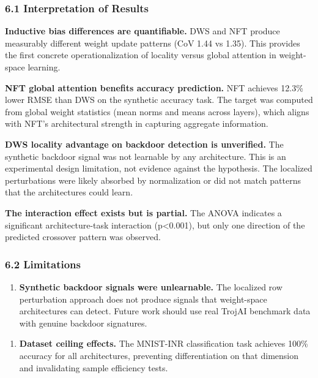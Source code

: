 
\subsubsection{6.1 Interpretation of Results}

\textbf{Inductive bias differences are quantifiable.} DWS and NFT produce measurably different weight update patterns (CoV 1.44 vs 1.35). This provides the first concrete operationalization of locality versus global attention in weight-space learning.

\textbf{NFT global attention benefits accuracy prediction.} NFT achieves 12.3\% lower RMSE than DWS on the synthetic accuracy task. The target was computed from global weight statistics (mean norms and means across layers), which aligns with NFT's architectural strength in capturing aggregate information.

\textbf{DWS locality advantage on backdoor detection is unverified.} The synthetic backdoor signal was not learnable by any architecture. This is an experimental design limitation, not evidence against the hypothesis. The localized perturbations were likely absorbed by normalization or did not match patterns that the architectures could learn.

\textbf{The interaction effect exists but is partial.} The ANOVA indicates a significant architecture-task interaction (p<0.001), but only one direction of the predicted crossover pattern was observed.

\subsubsection{6.2 Limitations}

\begin{enumerate}
\item \textbf{Synthetic backdoor signals were unlearnable.} The localized row perturbation approach does not produce signals that weight-space architectures can detect. Future work should use real TrojAI benchmark data with genuine backdoor signatures.
\end{enumerate}

\begin{enumerate}
\item \textbf{Dataset ceiling effects.} The MNIST-INR classification task achieves 100\% accuracy for all architectures, preventing differentiation on that dimension and invalidating sample efficiency tests.
\end{enumerate}

